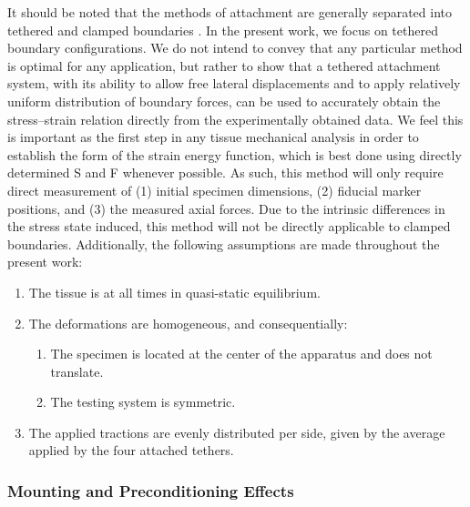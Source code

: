     
    It should be noted that the methods of attachment are generally separated into tethered \cite{sacks_biaxial_2000}\cite{bellini_biaxial_2011}\cite{azadani_comparison_2012}\cite{kamenskiy_passive_2014}\cite{gregory_comparison_2011} and clamped boundaries \cite{sun_effects_2005}\cite{oconnell_human_2011}\cite{sommer_multiaxial_2013}\cite{hu_influence_2013}\cite{simon-allue_unraveling_2014}. In the present work, we focus on tethered boundary configurations. We do not intend to convey that any particular method is optimal for any application, but rather to show that a tethered attachment system, with its ability to allow free lateral displacements and to apply relatively uniform distribution of boundary forces, can be used to accurately obtain the stress–strain relation directly from the experimentally obtained data. We feel this is important as the first step in any tissue mechanical analysis in order to establish the form of the strain energy function, which is best done using directly determined S and F whenever possible. As such, this method will only require direct measurement of (1) initial specimen dimensions, (2) fiducial marker positions, and (3) the measured axial forces. Due to the intrinsic differences in the stress state induced, this method will not be directly applicable to clamped boundaries. Additionally, the following assumptions are made throughout the present work:
        \begin{enumerate}
        \item The tissue is at all times in quasi-static equilibrium.
        \item The deformations are homogeneous, and consequentially:
            \begin{enumerate}
                \item The specimen is located at the center of the apparatus and does not translate.
                \item The testing system is symmetric.
            \end{enumerate}
        \item The applied tractions are evenly distributed per side, given by the average applied by the four attached tethers.
        \end{enumerate}
    
    
\subsubsection{Mounting and Preconditioning Effects}

